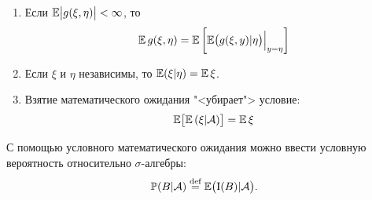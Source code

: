 \begin{namedthm}
\begin{enumerate}
\begin{proof}
\begin{equation*}
                        \Exp (\xi f(\eta) \cdot g(\eta))=\Exp (\xi h(\eta))=\Exp (\widehat{\xi} h(\eta))=\Exp (\zeta \cdot g(\eta)) \qedhere
                    \end{equation*}
                \end{proof}
        \fi
            \item 
                Если $\operatorname{\mathbb{E}} \bigl| g(\xi, \eta) \bigr| <\infty$, то
                \begin{equation*}
                    \operatorname{\mathbb{E}} g(\xi, \eta)=\operatorname{\mathbb{E}} \left[\Bigl.\operatorname{\mathbb{E}} \bigl(g(\xi, y) | \eta\bigr)\Bigr|_{y=\eta}\right]
                \end{equation*}
            \item 
                Если $\xi$ и $\eta$ независимы, то $\operatorname{\mathbb{E}} (\xi | \eta)=\operatorname{\mathbb{E}} \xi$.
            \item
                Взятие математического ожидания "<убирает"> условие:
                \begin{equation*}
                    \operatorname{\mathbb{E}} \bigl[ \operatorname{\mathbb{E}} \left(\xi | \mathcal{A} \right)\bigr] = \operatorname{\mathbb{E}} \xi
                \end{equation*}                
        \end{enumerate}
    \end{namedthm}
    С помощью условного математического ожидания можно ввести условную вероятность относительно $\sigma$-алгебры:
    \begin{equation*}
        \operatorname{\mathbb{P}}(B | \mathcal{A}) \overset{\text{def}}{=} \operatorname{\mathbb{E}} \bigl(\operatorname{\mathrm{I}}(B) | \mathcal{A} \bigr).
    \end{equation*}

\iffalse
